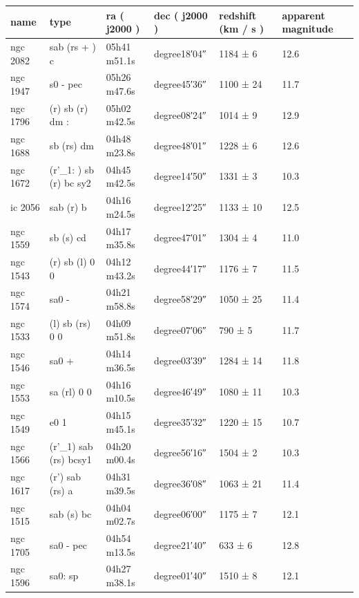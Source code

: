 \documentclass{article}
\begin{document}
\begin{tabular}{llllll}
\toprule
name & type & ra ( j2000 ) & dec ( j2000 ) & redshift (km / s ) & apparent magnitude \\
\midrule
ngc 2082 & sab (rs + ) c & 05h41 m51.1s &  degree18′04″ & 1184 ± 6 & 12.6 \\
ngc 1947 & s0 - pec & 05h26 m47.6s &  degree45′36″ & 1100 ± 24 & 11.7 \\
ngc 1796 & (r) sb (r) dm : & 05h02 m42.5s &  degree08′24″ & 1014 ± 9 & 12.9 \\
ngc 1688 & sb (rs) dm & 04h48 m23.8s &  degree48′01″ & 1228 ± 6 & 12.6 \\
ngc 1672 & (r'\_1: ) sb (r) bc sy2 & 04h45 m42.5s &  degree14′50″ & 1331 ± 3 & 10.3 \\
ic 2056 & sab (r) b & 04h16 m24.5s &  degree12′25″ & 1133 ± 10 & 12.5 \\
ngc 1559 & sb (s) cd & 04h17 m35.8s &  degree47′01″ & 1304 ± 4 & 11.0 \\
ngc 1543 & (r) sb (l) 0 0 & 04h12 m43.2s &  degree44′17″ & 1176 ± 7 & 11.5 \\
ngc 1574 & sa0 - & 04h21 m58.8s &  degree58′29″ & 1050 ± 25 & 11.4 \\
ngc 1533 & (l) sb (rs) 0 0 & 04h09 m51.8s &  degree07′06″ & 790 ± 5 & 11.7 \\
ngc 1546 & sa0 + & 04h14 m36.5s &  degree03′39″ & 1284 ± 14 & 11.8 \\
ngc 1553 & sa (rl) 0 0 & 04h16 m10.5s &  degree46′49″ & 1080 ± 11 & 10.3 \\
ngc 1549 & e0 1 & 04h15 m45.1s &  degree35′32″ & 1220 ± 15 & 10.7 \\
ngc 1566 & (r'\_1) sab (rs) bcsy1 & 04h20 m00.4s &  degree56′16″ & 1504 ± 2 & 10.3 \\
ngc 1617 & (r') sab (rs) a & 04h31 m39.5s &  degree36′08″ & 1063 ± 21 & 11.4 \\
ngc 1515 & sab (s) bc & 04h04 m02.7s &  degree06′00″ & 1175 ± 7 & 12.1 \\
ngc 1705 & sa0 - pec & 04h54 m13.5s &  degree21′40″ & 633 ± 6 & 12.8 \\
ngc 1596 & sa0: sp & 04h27 m38.1s &  degree01′40″ & 1510 ± 8 & 12.1 \\
\bottomrule
\end{tabular}
\end{document}
